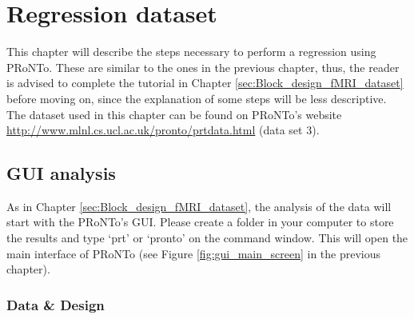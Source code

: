 
\chapter{Regression dataset}
\label{data_example2}
\minitoc

This chapter will describe the steps necessary to perform a regression using PRoNTo. These are similar to the ones in the previous chapter, thus, the reader is advised to complete the tutorial in Chapter \ref{sec:Block_design_fMRI_dataset} before moving on, since the explanation of some steps will be less descriptive. The dataset used in this chapter can be found on PRoNTo's website \url{http://www.mlnl.cs.ucl.ac.uk/pronto/prtdata.html} (data set 3).


\section{GUI analysis}
As in Chapter \ref{sec:Block_design_fMRI_dataset}, the analysis of the data will start with the PRoNTo's GUI. Please create a folder in your computer to store the results and type `prt' or `pronto' on the \matlab{} command window. This will open the main interface of PRoNTo (see Figure \ref{fig:gui_main_screen} in the previous chapter).



\subsection{Data \& Design}

